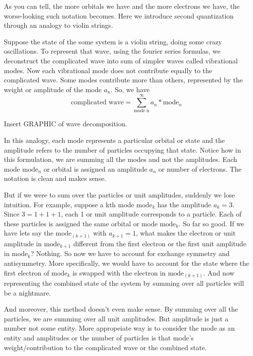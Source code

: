 \documentclass{article}
\begin{document}
As you can tell, the more orbitals we have and the more electrons we have,
the worse-looking such notation becomes. Here we introduce second quantization
through an analogy to violin strings.

Suppose the state of the some system is a violin string, doing some crazy
oscillations. To represent that wave, using the fourier series formulas, we
deconstruct the complicated wave into sum of simpler waves called vibrational
modes. Now each vibrational mode does not contribute equally to the
complicated wave. Some modes contribute more than others, represented by
the weight or amplitude of the mode \(a_n\). So, we have
\[\text{complicated wave} = \sum_{\text{mode n}}^{\infty} a_n * \text{mode}_n\]

Insert GRAPHIC of wave decomposition.

In this analogy, each mode represents a particular orbital or state and the
amplitude refers to the number of particles occupying that state. Notice how
in this formulation, we are summing all the modes and not the amplitudes.
Each mode \(\text{mode}_n\) or orbital is assigned an amplitude \(a_n\) or
number of electrons. The notation is clean and makes sense.

But if we were to sum over the particles or unit amplitudes, suddenly we lose
intuition. For example, suppose a kth mode \(\text{mode}_k\) has the amplitude
\(a_k = 3\). Since \(3 = 1 + 1 + 1\), each 1 or unit amplitude
corresponds to a particle. Each of these particles is assigned the same orbital
or mode \(\text{mode}_k\). So far so good.
If we have lets say the \(\text{mode}_(k+1)\) with \(a_{k+1} = 1\), what makes
the electron or unit amplitude in \(\text{mode}_{k+1}\) different from the
first electron or the first unit amplitude in \(\text{mode}_k\)? Nothing. So
now we have to account for exchange symmetry and antisymmetry. More specifically,
we would have to account for the state where the first electron of
\(\text{mode}_k\) is swapped with the electron in \(\text{mode}_(k+1)\). And now
representing the combined state of the system by summing over all particles
will be a nightmare.

And moreover, this method doesn't even make sense. By summing over all the
particles, we are summing over all unit amplitudes. But amplitude is just a number
not some entity. More appropeiate way is to consider the mode as an entity and
amplitudes or the number of particles is that mode's weight/contribution to
the complicated wave or the combined state.
\end{document}
